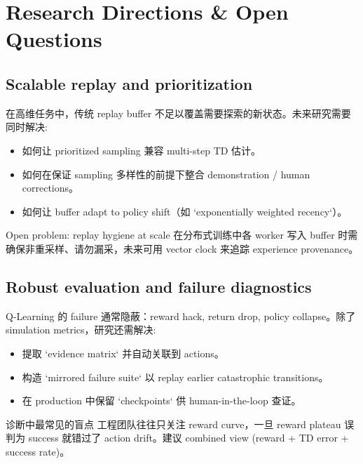 \section{Research Directions \& Open Questions}

\subsection{Scalable replay and prioritization}

在高维任务中，传统 replay buffer 不足以覆盖需要探索的新状态。未来研究需要同时解决:

\begin{itemize}
    \item 如何让 prioritized sampling 兼容 multi-step TD 估计。
    \item 如何在保证 sampling 多样性的前提下整合 demonstration / human corrections。
    \item 如何让 buffer adapt to policy shift（如 `exponentially weighted recency`）。
\end{itemize}

\begin{importantbox}{Open problem: replay hygiene at scale}
在分布式训练中各 worker 写入 buffer 时需确保非重采样、请勿漏采，未来可用 vector clock 来追踪 experience provenance。
\end{importantbox}

\subsection{Robust evaluation and failure diagnostics}

Q-Learning 的 failure 通常隐蔽：reward hack, return drop, policy collapse。除了 simulation metrics，研究还需解决:

\begin{itemize}
    \item 提取 `evidence matrix` 并自动关联到 actions。
    \item 构造 `mirrored failure suite` 以 replay earlier catastrophic transitions。
    \item 在 production 中保留 `checkpoints` 供 human-in-the-loop 查证。
\end{itemize}

\begin{warningbox}{诊断中最常见的盲点}
工程团队往往只关注 reward curve，一旦 reward plateau 误判为 success 就错过了 action drift。建议 combined view (reward + TD error + success rate)。
\end{warningbox}

